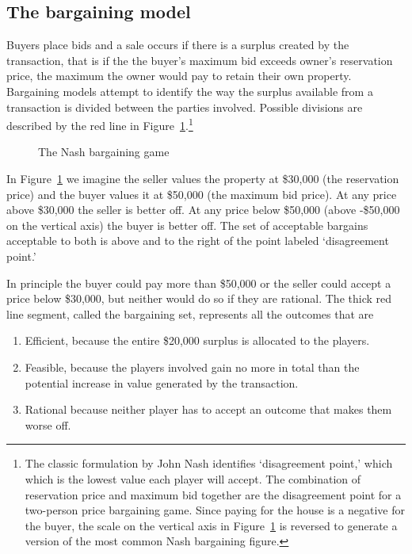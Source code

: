 \subsection{The bargaining model} \label{sec:bargaining-model}
Buyers place bids and a sale occurs if there is a surplus created by the transaction, that is if the the buyer's maximum bid exceeds owner's \gls{reservation price}, the maximum the owner would pay to retain their own property. 
Bargaining models attempt to identify the way the surplus available from a transaction is divided between the parties involved. Possible divisions are described by the red line in Figure~\ref{fig:Nash-bargaining-game}.\footnote{The classic  formulation by John Nash %
identifies  `\gls{disagreement point},' which which is the  lowest value each player will accept. The combination of reservation price and maximum bid together are the disagreement point for a two-person price bargaining game. Since paying for the house is a negative for the buyer, the scale on the vertical axis  in Figure~\ref{fig:Nash-bargaining-game} is reversed to generate a version of the most common Nash bargaining figure.} 

    \begin{figure}
        \centering
        
        \caption{The Nash bargaining game}
        \label{fig:Nash-bargaining-game}
    \end{figure}


In Figure~\ref{fig:Nash-bargaining-game} we imagine the seller values the property at \$30,000 (the reservation price) and the buyer values it at \$50,000 (the maximum bid price).  At any price above \$30,000 the seller is better off. At any price below \$50,000 (above -\$50,000 on the vertical axis) the buyer is better off. 
The set of acceptable bargains acceptable to both is above and to the right of the point labeled `disagreement point.' 

In principle the buyer could pay more than \$50,000 or the seller could accept a price below \$30,000, but neither would do so if they are rational. 
The thick red line segment, called the bargaining set, represents all the outcomes that are\begin{enumerate}
    \item Efficient, because the entire \$20,000 surplus is allocated to the players. 
    \item Feasible, because the players involved gain no more in total than the potential increase in value generated by the transaction.
    \item Rational because neither player has to accept an outcome that makes them worse off.
\end{enumerate}   

